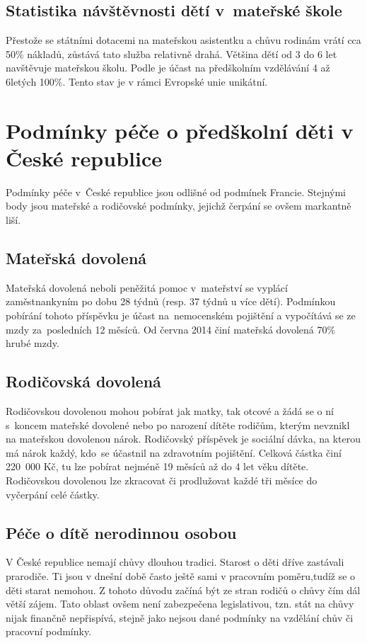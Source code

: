 			\subsection{Statistika návštěvnosti dětí v mateřské škole}
			\label{statistika}
				Přestože se státními dotacemi na mateřskou asistentku a chůvu rodinám vrátí cca 50\% nákladů, zůstává tato služba relativně drahá. Většina dětí od 3 do 6 let navštěvuje mateřskou školu. Podle \cite{Eurydice} je účast na předškolním vzdělávání 4 až 6letých 100\%. Tento stav je v rámci Evropské unie unikátní. 
			

		\section{Podmínky péče o předškolní děti v České republice}
			Podmínky péče v České republice jsou odlišné od podmínek Francie. Stejnými body jsou mateřské a rodičovské podmínky, jejichž čerpání se ovšem markantně liší.

			\subsection{Mateřská dovolená}
				Mateřská dovolená neboli peněžitá pomoc v mateřství se vyplácí zaměstnankyním po dobu 28 týdnů (resp. 37 týdnů u více dětí). Podmínkou pobírání tohoto příspěvku je účast na nemocenském pojištění a vypočítává se ze mzdy za posledních 12 měsíců. Od června 2014 činí mateřská dovolená 70\% hrubé mzdy. \citep{materska}

			\subsection{Rodičovská dovolená}
				Rodičovskou dovolenou mohou pobírat jak matky, tak otcové a žádá se o ní s koncem mateřské dovolené nebo po narození dítěte rodičům, kterým nevznikl na mateřskou dovolenou nárok. Rodičovský příspěvek je sociální dávka, na kterou má nárok každý, kdo se účastnil na zdravotním pojištění. Celková částka činí 220 000 Kč, tu lze pobírat nejméně 19 měsíců až do 4 let věku dítěte. Rodičovskou dovolenou lze zkracovat či prodlužovat každé tři měsíce do vyčerpání celé částky. \citep{rodicovska}

			\subsection{Péče o dítě nerodinnou osobou}
				V České republice nemají chůvy dlouhou tradici. Starost o děti dříve zastávali prarodiče. Ti jsou v dnešní době často ještě sami v pracovním poměru,tudíž se o děti starat nemohou. Z tohoto důvodu začíná být ze stran rodičů o chůvy čím dál větší zájem. Tato oblast ovšem není zabezpečena legislativou, tzn. stát na chůvy nijak finančně nepřispívá, stejně jako nejsou dané podmínky na vzdělání chův či pracovní podmínky. 


